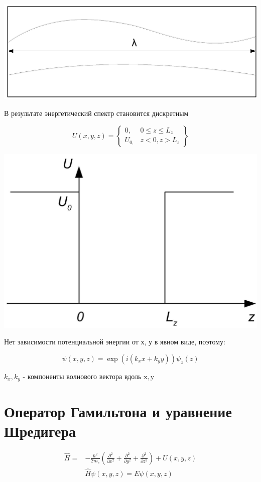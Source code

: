 \documentclass[10pt]{article}
\begin{document}
\begin{center}
\includegraphics[max width=\textwidth]{2023_05_21_66a3dfca5be088b7d6b7g-01}
\end{center}

В результате энергетический спектр становится дискретным

$$
U(x, y, z)=\left\{\begin{array}{cc}
0, & 0 \leq z \leq L_{z} \\
U_{0,} & z<0, z>L_{z}
\end{array}\right\}
$$

\begin{center}
\includegraphics[max width=\textwidth]{2023_05_21_66a3dfca5be088b7d6b7g-02}
\end{center}

Нет зависимости потенциальной энергии от х, у в явном виде, поэтому:

$$
\psi(x, y, z)=\exp \left(i\left(k_{x} x+k_{y} y\right)\right) \psi_{z}(z)
$$

$k_{x}, k_{y}$ - компоненты волнового вектора вдоль $\mathrm{x}, \mathrm{y}$

\section{Оператор Гамильтона и уравнение Шредигера}
$$
\begin{aligned}
\hat{H}= & -\frac{\hbar^{2}}{2 m_{e}}\left(\frac{\partial^{2}}{\partial x^{2}}+\frac{\partial^{2}}{\partial y^{2}}+\frac{\partial^{2}}{\partial z^{2}}\right)+U(x, y, z) \\
& \hat{H} \psi(x, y, z)=E \psi(x, y, z)
\end{aligned}
$$
\end{document}
